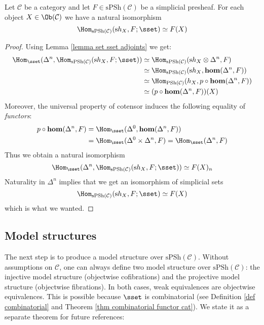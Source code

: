 \begin{thm} \label{thm simplicial yoneda}
Let $\mathcal C$ be a category and let $F \in \mathrm{sPSh}(\mathcal C)$ be a simplicial presheaf. For each object $X \in \Ob(\mathcal C)$ we have a natural isomorphism
\[
\Hom_{\mathrm{sPSh}(\mathcal C)}(\mathrm sh_X,F;\sset) \simeq F(X)
\]
\end{thm}

\begin{proof}
Using Lemma \ref{lemma set sset adjoints} we get:
\begin{align*}
\Hom_{\sset}(\Delta^n, \Hom_{\mathrm{sPSh}(\mathcal C)}(\mathrm sh_X,F;\sset)) & \simeq \Hom_{\mathrm{sPSh}(\mathcal C)}(\mathrm sh_X \otimes \Delta^n, F) \\
& \simeq \Hom_{\mathrm{sPSh}(\mathcal C)}(\mathrm sh_X, \mathbf{hom}(\Delta^n,F)) \\
& \simeq \Hom_{\mathrm{PSh}(\mathcal C)}(h_X, p \circ \mathbf{hom}(\Delta^n,F)) \\
& \simeq (p \circ \mathbf{hom}(\Delta^n,F))(X)
\end{align*}
Moreover, the universal property of cotensor induces the following equality of \emph{functors}:
\begin{align*}
p \circ \mathbf{hom}(\Delta^n,F) & = \Hom_{\sset}(\Delta^0, \mathbf{hom}(\Delta^n,F)) \\
& = \Hom_{\sset}(\Delta^0 \times \Delta^n,F) = \Hom_{\sset}(\Delta^n,F)
\end{align*}
Thus we obtain a natural isomorphism
\[
\Hom_{\sset}(\Delta^n, \Hom_{\mathrm{sPSh}(\mathcal C)}(\mathrm sh_X,F;\sset)) \simeq F(X)_n
\]
Naturality in $\Delta^n$ implies that we get an isomorphism of simplicial sets
\[
\Hom_{\mathrm{sPSh}(\mathcal C)}(\mathrm sh_X,F;\sset) \simeq F(X)
\]
which is what we wanted.
\end{proof}

\subsection{Model structures}

The next step is to produce a model structure over $\mathrm{sPSh}(\mathcal C)$. Without assumptions on $\mathcal C$, one can always define two model structure over $\mathrm{sPSh}(\mathcal C)$: the injective model structure (objectwise cofibrations) and the projective model structure (objectwise fibrations). In both cases, weak equivalences are objectwise equivalences. This is possible because $\sset$ is combinatorial (see Definition \ref{def combinatorial} and Theorem \ref{thm combinatorial functor cat}). We state it as a separate theorem for future references:

